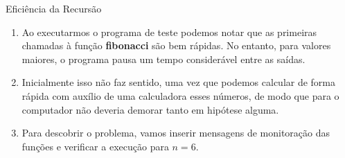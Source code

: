 \begin{frame}[fragile]{Eficiência da Recursão}

\begin{enumerate}
	\item Ao executarmos o programa de teste podemos notar que as primeiras chamadas à função \textbf{fibonacci} são bem rápidas. No entanto, para valores maiores, o programa pausa um tempo considerável entre as saídas.
	\item Inicialmente isso não faz sentido, uma vez que podemos calcular de forma rápida com auxílio de uma calculadora esses números, de modo que para o computador não deveria demorar tanto em hipótese alguma.
	\item Para descobrir o problema, vamos inserir mensagens de monitoração das funções e verificar a execução para $n = 6$.
\end{enumerate}
\end{frame}

